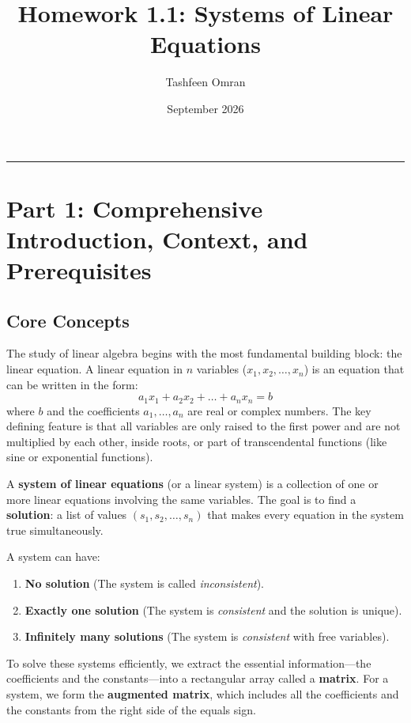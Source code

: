 \documentclass[11pt]{article}
\title{\textbf{Homework 1.1: Systems of Linear Equations}}
\author{Tashfeen Omran}
\date{September 2026}
\begin{document}
\maketitle
\tableofcontents
\vspace{1cm}
\hrule
\vspace{1cm}

\section{Part 1: Comprehensive Introduction, Context, and Prerequisites}

\subsection{Core Concepts}
The study of linear algebra begins with the most fundamental building block: the linear equation. A linear equation in $n$ variables ($x_1, x_2, \dots, x_n$) is an equation that can be written in the form:
\[ a_1x_1 + a_2x_2 + \dots + a_nx_n = b \]
where $b$ and the coefficients $a_1, \dots, a_n$ are real or complex numbers. The key defining feature is that all variables are only raised to the first power and are not multiplied by each other, inside roots, or part of transcendental functions (like sine or exponential functions).

A \textbf{system of linear equations} (or a linear system) is a collection of one or more linear equations involving the same variables. The goal is to find a \textbf{solution}: a list of values $(s_1, s_2, \dots, s_n)$ that makes every equation in the system true simultaneously. 

A system can have:
\begin{enumerate}
    \item \textbf{No solution} (The system is called \textit{inconsistent}).
    \item \textbf{Exactly one solution} (The system is \textit{consistent} and the solution is unique).
    \item \textbf{Infinitely many solutions} (The system is \textit{consistent} with free variables).
\end{enumerate}

To solve these systems efficiently, we extract the essential information---the coefficients and the constants---into a rectangular array called a \textbf{matrix}. For a system, we form the \textbf{augmented matrix}, which includes all the coefficients and the constants from the right side of the equals sign.
\end{document}
